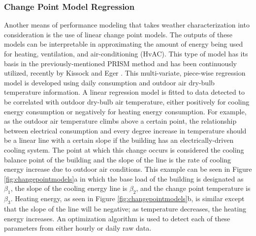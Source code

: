 \subsubsection{Change Point Model Regression}
\label{sec:changepointmodels}

Another means of performance modeling that takes weather characterization into consideration is the use of linear change point models. The outputs of these models can be interpretable in approximating the amount of energy being used for heating, ventilation, and air-conditioning (HvAC). This type of model has its basis in the previously-mentioned PRISM method and has been continuously utilized, recently by Kissock and Eger \cite{Kelly_Kissock_2008}. This multi-variate, piece-wise regression model is developed using daily consumption and outdoor air dry-bulb temperature information. A linear regression model is fitted to data detected to be correlated with outdoor dry-bulb air temperature, either positively for cooling energy consumption or negatively for heating energy consumption. For example, as the outdoor air temperature climbs above a certain point, the relationship between electrical consumption and every degree increase in temperature should be a linear line with a certain slope if the building has an electrically-driven cooling system. The point at which this change occurs is considered the cooling balance point of the building and the slope of the line is the rate of cooling energy increase due to outdoor air conditions. This example can be seen in Figure \ref{fig:changepointmodels}a in which the base load of the building is designated as $\beta_1$, the slope of the cooling energy line is $\beta_2$, and the change point temperature is $\beta_3$. Heating energy, as seen in Figure \ref{fig:changepointmodels}b, is similar except that the slope of the line will be negative; as temperature decreases, the heating energy increases. An optimization algorithm is used to detect each of these parameters from either hourly or daily raw data.